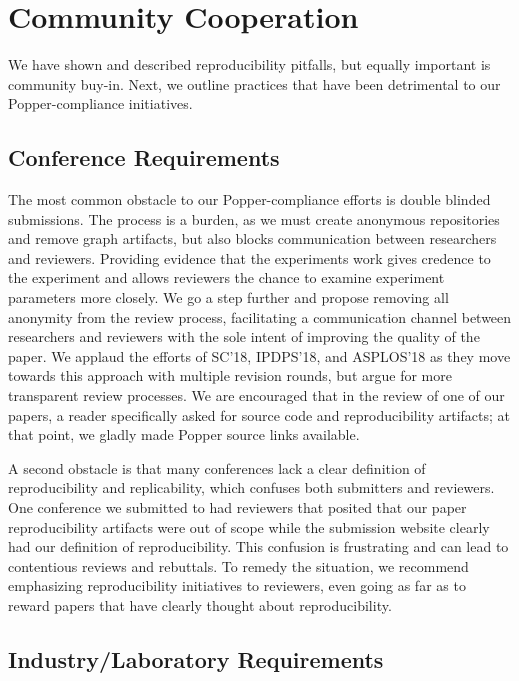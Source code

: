 \section{Community Cooperation}
\label{sec:community-cooperation}

We have shown and described reproducibility pitfalls, but equally important is
community buy-in. Next, we outline practices that have been detrimental to our
Popper-compliance initiatives.

\subsection{Conference Requirements}

The most common obstacle to our Popper-compliance efforts is double blinded
submissions. The process is a burden, as we must create anonymous repositories
and remove graph artifacts, but also blocks communication between researchers
and reviewers. Providing evidence that the experiments work gives credence to
the experiment and allows reviewers the chance to examine experiment parameters
more closely. We go a step further and propose removing all anonymity from the
review process, facilitating a communication channel between researchers and
reviewers with the sole intent of improving the quality of the paper. We
applaud the efforts of SC'18, IPDPS'18, and ASPLOS'18 as they move towards this
approach with multiple revision rounds, but argue for more transparent review
processes. We are encouraged that in the review of one of our papers, a reader
specifically asked for source code and reproducibility artifacts; at that
point, we gladly made Popper source links available.

A second obstacle is that many conferences lack a clear definition of
reproducibility and replicability, which confuses both submitters and
reviewers. One conference we submitted to had reviewers that posited that
our paper reproducibility artifacts were out of scope while the submission
website clearly had our definition of reproducibility. This confusion is
frustrating and can lead to contentious reviews and rebuttals. To remedy the
situation, we recommend emphasizing reproducibility initiatives to reviewers,
even going as far as to reward papers that have clearly thought about
reproducibility.

\subsection{Industry/Laboratory Requirements}
\label{sec:reqs}

